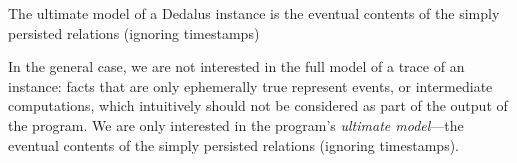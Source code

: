 \begin{definition}

The ultimate model of a Dedalus instance is the eventual contents of the simply
persisted relations (ignoring timestamps)

\end{definition}

In the general case, we are not interested in the full model of a trace of an
instance: facts that are only ephemerally true represent events, or intermediate
computations, which intuitively should not be considered as part of the output
of the program.  We are only interested in the program's {\em ultimate
  model}---the eventual contents of the simply persisted relations (ignoring
timestamps).
